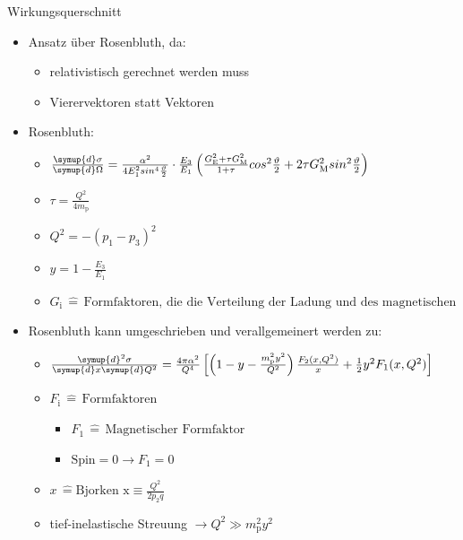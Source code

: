 \documentclass[aspectratio=1610, 9pt]{beamer}
\begin{document}
\begin{frame}{Wirkungsquerschnitt}
\begin{itemize}
  \item{Ansatz über Rosenbluth, da:}
  \begin{itemize}
    \item{relativistisch gerechnet werden muss}
    \item{Vierervektoren statt Vektoren}
  \end{itemize}
  \item{Rosenbluth:}
  \begin{itemize}
    \item{ $ \frac{\symup{d} \sigma}{\symup{d} \Omega }  = \frac{\alpha^2}{4 E^2_1 sin^4{\frac{\vartheta}{2}}} \cdot \frac{E_3}{E_1} \left( \frac{G^2_\text{E}+ \tau G^2_\text{M}}{1+\tau} cos^2{\frac{\vartheta}{2}} +2\tau G^2_\text{M} sin^2{\frac{\vartheta}{2}} \right) $}
    \item{ $ \tau = \frac{Q^2}{4m_\text{p}} $ }
    \item{ $ Q^2 = -(p_1-p_3)^2$ }
    \item{ $y = 1-\frac{E_3}{E_1} $ }
    \item{$G_\text{i} \,\hat{=} \, \text{Formfaktoren, die die Verteilung der Ladung und des magnetischen Moments beschreiben}$}
  \end{itemize}
\end{itemize}  
\end{frame}

\begin{frame}
  \begin{itemize}
  \item{Rosenbluth kann umgeschrieben und verallgemeinert werden zu: }
  \begin{itemize}
    \item{$ \frac{\symup{d}^2\sigma}{ \symup{d}x \symup{d}Q^2} = \frac{4 \pi \alpha^2}{Q^4} \left[ \left( 1 - y - \frac{m^2_\text{p} y^2}{Q^2} \right) \frac{F_2(x, Q^2)}{x} + \frac{1}{2}y^2F_1(x, Q^2) \right]  $}
    \item{$F_\text{i} \,\hat{=} \, \text{Formfaktoren} $}
    \begin{itemize}
      \item{$F_1 \,\hat{=} \, \text{Magnetischer Formfaktor} $}
      \item{$\text{Spin} = 0 \rightarrow F_1 = 0$}
    \end{itemize}
    \item{$x \,\hat{=} \text{Bjorken x} \equiv \frac{Q^2}{2 p_2 q} $}
    \item{tief-inelastische Streuung $\rightarrow Q^2 \gg  m^2_\text{p} y^2 $}
  \end{itemize}
  \end{itemize}
\end{frame}
\end{document}
